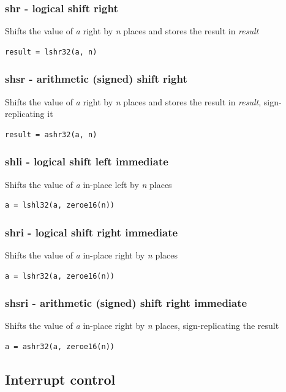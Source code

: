 \documentclass[a4paper,10pt]{article}
\begin{document}
\subsubsection{shr - logical shift right}
	{Shifts the value of \emph{a} right by \emph{n} places and stores the result in \emph{result}}
\begin{lstlisting}
result = lshr32(a, n)
\end{lstlisting}

\subsubsection{shsr - arithmetic (signed) shift right}
	{Shifts the value of \emph{a} right by \emph{n} places and stores the result in \emph{result}, sign-replicating it}
\begin{lstlisting}
result = ashr32(a, n)
\end{lstlisting}

\subsubsection{shli - logical shift left immediate}
	{Shifts the value of \emph{a} in-place left by \emph{n} places}
\begin{lstlisting}
a = lshl32(a, zeroe16(n))
\end{lstlisting}

\subsubsection{shri - logical shift right immediate}
	{Shifts the value of \emph{a} in-place right by \emph{n} places}
\begin{lstlisting}
a = lshr32(a, zeroe16(n))
\end{lstlisting}

\subsubsection{shsri - arithmetic (signed) shift right immediate}
	{Shifts the value of \emph{a} in-place right by \emph{n} places, sign-replicating the result}
\begin{lstlisting}
a = ashr32(a, zeroe16(n))
\end{lstlisting}

\subsection{Interrupt control}
\end{document}
